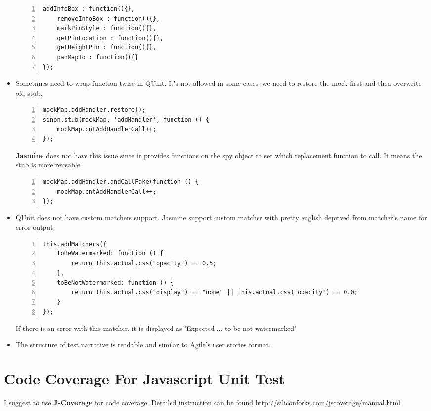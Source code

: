 \documentclass[a4paper,11pt]{article}
\begin{document}
\begin{itemize}
\begin{lstlisting}[label=some-code-test,caption=Sample QUnit Test Case For Creating Spy/Mock,style = customjava, numbers=left]
	addInfoBox : function(){}, 
	removeInfoBox : function(){},
	markPinStyle : function(){},
	getPinLocation : function(){},
	getHeightPin : function(){},
	panMapTo : function(){}
});
			\end{lstlisting}
	\item Sometimes need to wrap function twice in QUnit. It's not allowed in some cases, we need to restore the mock first and then overwrite old stub.
			\begin{lstlisting}[label=some-code-test,caption=Sample QUnit Test Case For Overwrite Old Stub,style = customjava, numbers=left]
mockMap.addHandler.restore();
sinon.stub(mockMap, 'addHandler', function () {
	mockMap.cntAddHandlerCall++;
});
			\end{lstlisting}
	\textbf{Jasmine} does not have this issue since it provides functions on the spy object to set which replacement function to call. It means the stub is more reusable
\begin{lstlisting}[label=some-code-test,caption=Sample Jasmine Test Case For Overwrite Old Spy/Mock,style = customjava, numbers=left]
mockMap.addHandler.andCallFake(function () {
	mockMap.cntAddHandlerCall++;
});
\end{lstlisting}
	\item QUnit does not have custom matchers support. Jasmine support custom matcher with pretty english deprived from matcher's name for error output.
\begin{lstlisting}[label=some-code-test,caption=Jasmine's custom matcher,style = customjava, numbers=left]
this.addMatchers({
	toBeWatermarked: function () {
		return this.actual.css("opacity") == 0.5;
	},
	toBeNotWatermarked: function () {
		return this.actual.css("display") == "none" || this.actual.css('opacity') == 0.0;
	}
});
\end{lstlisting}	
	If there is an error with this matcher, it is displayed as 'Expected ... to be not watermarked'
	\item The structure of test narrative is readable and similar to Agile's user stories format.
	\end{itemize}
\section{ Code Coverage For Javascript Unit Test }
I suggest to use \textbf{JsCoverage} for code coverage. Detailed instruction can be found  \url{http://siliconforks.com/jscoverage/manual.html}
\end{document}
